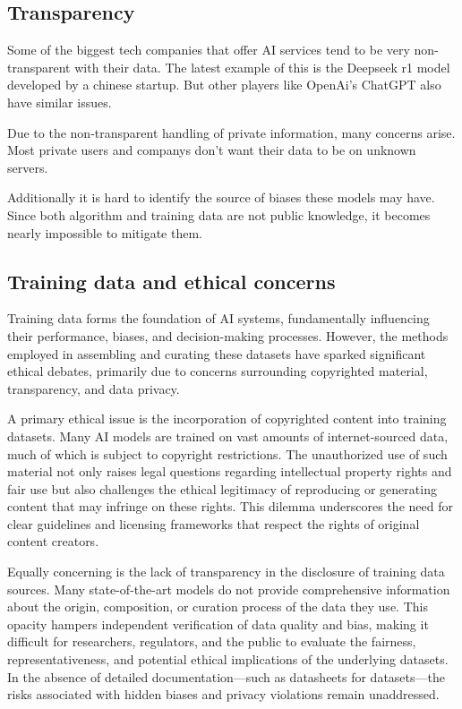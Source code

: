 \cite{AiDataBias}

\subsection{Transparency}
\label{subsec:transparence}

Some of the biggest tech companies that offer AI services tend to be very non-transparent with their data. 
The latest example of this is the Deepseek r1 model developed by a chinese startup. But other players like OpenAi's ChatGPT also have similar issues.

Due to the non-transparent handling of private information, many concerns arise. Most private users and companys don't want their data to be on unknown servers.

Additionally it is hard to identify the source of biases these models may have. Since both algorithm and training data are not public knowledge, it becomes nearly impossible to mitigate them.

\cite{AiTransparancy}

\subsection{Training data and ethical concerns}
\label{subsec:training-data-and-ethical-concerns}

Training data forms the foundation of AI systems, fundamentally influencing their performance, biases, and decision-making processes. However, the methods employed in assembling and curating these datasets have sparked significant ethical debates, primarily due to concerns surrounding copyrighted material, transparency, and data privacy.

A primary ethical issue is the incorporation of copyrighted content into training datasets. Many AI models are trained on vast amounts of internet-sourced data, much of which is subject to copyright restrictions. The unauthorized use of such material not only raises legal questions regarding intellectual property rights and fair use but also challenges the ethical legitimacy of reproducing or generating content that may infringe on these rights. This dilemma underscores the need for clear guidelines and licensing frameworks that respect the rights of original content creators.

Equally concerning is the lack of transparency in the disclosure of training data sources. Many state-of-the-art models do not provide comprehensive information about the origin, composition, or curation process of the data they use. This opacity hampers independent verification of data quality and bias, making it difficult for researchers, regulators, and the public to evaluate the fairness, representativeness, and potential ethical implications of the underlying datasets. In the absence of detailed documentation—such as datasheets for datasets—the risks associated with hidden biases and privacy violations remain unaddressed.

